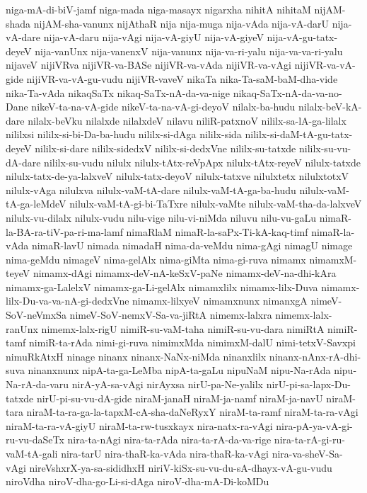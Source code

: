 {niga-mA-di-biV-jamf
niga-mada
niga-masayx
nigarxha
nihitA
nihitaM
nijAM-shada
nijAM-sha-vanunx
nijAthaR
nija
nija-muga
nija-vAda
nija-vA-darU
nija-vA-dare
nija-vA-daru
nija-vAgi
nija-vA-giyU
nija-vA-giyeV
nija-vA-gu-tatx-deyeV
nija-vanUnx
nija-vanenxV
nija-vanunx
nija-va-ri-yalu
nija-va-va-ri-yalu
nijaveV
nijiVRva
nijiVR-va-BASe
nijiVR-va-vAda
nijiVR-va-vAgi
nijiVR-va-vA-gide
nijiVR-va-vA-gu-vudu
nijiVR-vaveV
nikaTa
nika-Ta-saM-baM-dha-vide
nika-Ta-vAda
nikaqSaTx
nikaq-SaTx-nA-da-va-nige
nikaq-SaTx-nA-da-va-no-Dane
nikeV-ta-na-vA-gide
nikeV-ta-na-vA-gi-deyoV
nilalx-ba-hudu
nilalx-beV-kA-dare
nilalx-beVku
nilalxde
nilalxdeV
nilavu
niliR-patxnoV
nililx-sa-lA-ga-lilalx
nililxsi
nililx-si-bi-Da-ba-hudu
nililx-si-dAga
nililx-sida
nililx-si-daM-tA-gu-tatx-deyeV
nililx-si-dare
nililx-sidedxV
nililx-si-dedxVne
nililx-su-tatxde
nililx-su-vu-dA-dare
nililx-su-vudu
nilulx
nilulx-tAtx-reVpApx
nilulx-tAtx-reyeV
nilulx-tatxde
nilulx-tatx-de-ya-lalxveV
nilulx-tatx-deyoV
nilulx-tatxve
nilulxtetx
nilulxtotxV
nilulx-vAga
nilulxva
nilulx-vaM-tA-dare
nilulx-vaM-tA-ga-ba-hudu
nilulx-vaM-tA-ga-leMdeV
nilulx-vaM-tA-gi-bi-TaTxre
nilulx-vaMte
nilulx-vaM-tha-da-lalxveV
nilulx-vu-dilalx
nilulx-vudu
nilu-vige
nilu-vi-niMda
niluvu
nilu-vu-gaLu
nimaR-la-BA-ra-tiV-pa-ri-ma-lamf
nimaRlaM
nimaR-la-saPx-Ti-kA-kaq-timf
nimaR-la-vAda
nimaR-lavU
nimada
nimadaH
nima-da-veMdu
nima-gAgi
nimagU
nimage
nima-geMdu
nimageV
nima-gelAlx
nima-giMta
nima-gi-ruva
nimamx
nimamxM-teyeV
nimamx-dAgi
nimamx-deV-nA-keSxV-paNe
nimamx-deV-na-dhi-kAra
nimamx-ga-LalelxV
nimamx-ga-Li-gelAlx
nimamxlilx
nimamx-lilx-Duva
nimamx-lilx-Du-va-va-nA-gi-dedxVne
nimamx-lilxyeV
nimamxnunx
nimanxgA
nimeV-SoV-neVmxSa
nimeV-SoV-nemxV-Sa-va-jiRtA
nimemx-lalxra
nimemx-lalx-ranUnx
nimemx-lalx-rigU
nimiR-su-vaM-taha
nimiR-su-vu-dara
nimiRtA
nimiR-tamf
nimiR-ta-rAda
nimi-gi-ruva
nimimxMda
nimimxM-dalU
nimi-tetxV-Savxpi
nimuRkAtxH
ninage
ninanx
ninanx-NaNx-niMda
ninanxlilx
ninanx-nAnx-rA-dhi-suva
ninanxnunx
nipA-ta-ga-LeMba
nipA-ta-gaLu
nipuNaM
nipu-Na-rAda
nipu-Na-rA-da-varu
nirA-yA-sa-vAgi
nirAyxsa
nirU-pa-Ne-yalilx
nirU-pi-sa-lapx-Du-tatxde
nirU-pi-su-vu-dA-gide
niraM-janaH
niraM-ja-namf
niraM-ja-navU
niraM-tara
niraM-ta-ra-ga-la-tapxM-cA-sha-daNeRyxY
niraM-ta-ramf
niraM-ta-ra-vAgi
niraM-ta-ra-vA-giyU
niraM-ta-rw-tusxkayx
nira-natx-ra-vAgi
nira-pA-ya-vA-gi-ru-vu-daSeTx
nira-ta-nAgi
nira-ta-rAda
nira-ta-rA-da-va-rige
nira-ta-rA-gi-ru-vaM-tA-gali
nira-tarU
nira-thaR-ka-vAda
nira-thaR-ka-vAgi
nira-va-sheV-Sa-vAgi
nireVshxrX-ya-sa-sididhxH
niriV-kiSx-su-vu-du-sA-dhayx-vA-gu-vudu
niroVdha
niroV-dha-go-Li-si-dAga
niroV-dha-mA-Di-koMDu
}
